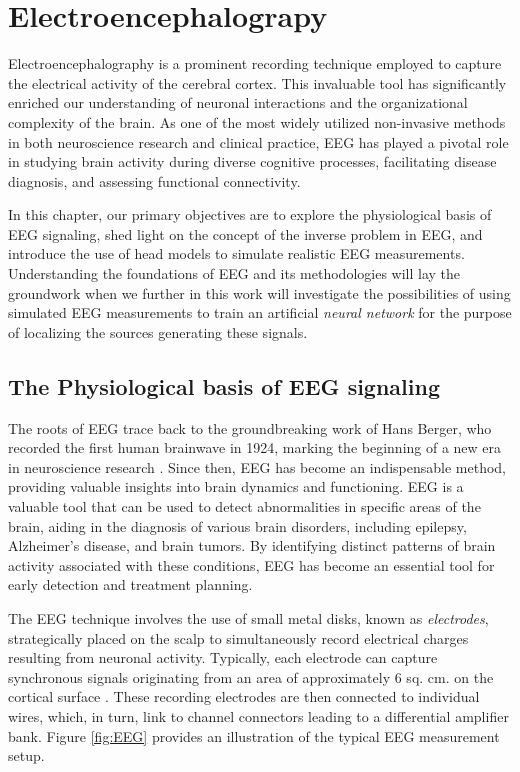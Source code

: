 \documentclass[a4paper, UKenglish, 11pt]{uiomaster}
\begin{document}
\chapter{Electroencephalograpy}
Electroencephalography is a prominent recording technique employed to capture the electrical activity of the cerebral cortex. This invaluable tool has significantly enriched our understanding of neuronal interactions and the organizational complexity of the brain. As one of the most widely utilized non-invasive methods in both neuroscience research and clinical practice, EEG has played a pivotal role in studying brain activity during diverse cognitive processes, facilitating disease diagnosis, and assessing functional connectivity.

In this chapter, our primary objectives are to explore the physiological basis of EEG signaling, shed light on the concept of the inverse problem in EEG, and introduce the use of head models to simulate realistic EEG measurements. Understanding the foundations of EEG and its methodologies will lay the groundwork when we further in this work will investigate the possibilities of using simulated EEG measurements to train an artificial \emph{neural network} for the purpose of localizing the sources generating these signals. 

\section{The Physiological basis of EEG signaling}
The roots of EEG trace back to the groundbreaking work of Hans Berger, who recorded the first human brainwave in 1924, marking the beginning of a new era in neuroscience research \cite{wiki:electroencephalography}. Since then, EEG has become an indispensable method, providing valuable insights into brain dynamics and functioning. EEG is a valuable tool that can be used to detect abnormalities in specific areas of the brain, aiding in the diagnosis of various brain disorders, including epilepsy, Alzheimer's disease, and brain tumors. By identifying distinct patterns of brain activity associated with these conditions, EEG has become an essential tool for early detection and treatment planning.

The EEG technique involves the use of small metal disks, known as \emph{electrodes}, strategically placed on the scalp to simultaneously record electrical charges resulting from neuronal activity. Typically, each electrode can capture synchronous signals originating from an area of approximately 6 sq. cm. on the cortical surface \cite{bromfield2006introduction}. These recording electrodes are then connected to individual wires, which, in turn, link to channel connectors leading to a differential amplifier bank. Figure \ref{fig:EEG} provides an illustration of the typical EEG measurement setup.
\end{document}
